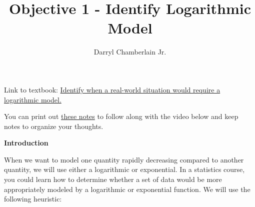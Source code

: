 \documentclass{ximera}
\author{Darryl Chamberlain Jr.}
\title{Objective 1 - Identify Logarithmic Model}
\begin{document}
\begin{abstract}

\end{abstract}

\maketitle
 
Link to textbook: 
\href{https://cnx.org/contents/mwjClAV_@8.21:_tqWoaDz@17/Exponential-and-Logarithmic-Models}{Identify when a real-world situation would require a logarithmic model.}

You can print out \href{http://people.clas.ufl.edu/dchamberlain31/files/M11M-Objective-1-Identify-Log-Model.pdf}{these notes} to follow along with the video below and keep notes to organize your thoughts.

 

\begin{center} \textbf{\Large Introduction} \end{center}

When we want to model one quantity rapidly decreasing compared to another quantity, we will use either a logarithmic or exponential. In a statistics course, you could learn how to determine whether a set of data would be more appropriately modeled by a logarithmic or exponential function. We will use the following heuristic:
\end{document}
